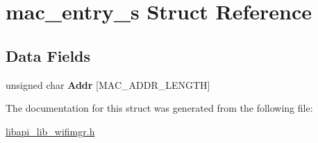 \hypertarget{structmac__entry__s}{}\section{mac\+\_\+entry\+\_\+s Struct Reference}
\label{structmac__entry__s}
\subsection*{Data Fields}
\begin{DoxyCompactItemize}
\item 
\mbox{\label{structmac__entry__s_ad6ee9b22e1828d0f263ea9d577cc0bd1}} 
unsigned char {\bfseries Addr} \mbox{[}M\+A\+C\+\_\+\+A\+D\+D\+R\+\_\+\+L\+E\+N\+G\+TH\mbox{]}
\end{DoxyCompactItemize}


The documentation for this struct was generated from the following file\+:\begin{DoxyCompactItemize}
\item 
\hyperlink{libapi__lib__wifimgr_8h}{libapi\+\_\+lib\+\_\+wifimgr.\+h}\end{DoxyCompactItemize}
